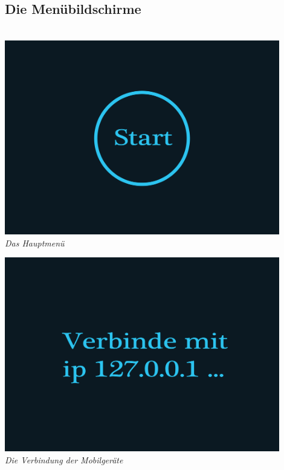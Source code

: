 \begin{flushright}

\subsection{Die Menübildschirme}

\ \\
\includegraphics[width=0.9\textwidth]{img/hauptmenu.png}\\
\textit{Das Hauptmenü}

\newpage

\includegraphics[width=0.9\textwidth]{img/connect.png}\\
\textit{Die Verbindung der Mobilgeräte}\\[2em]


\end{flushright}
